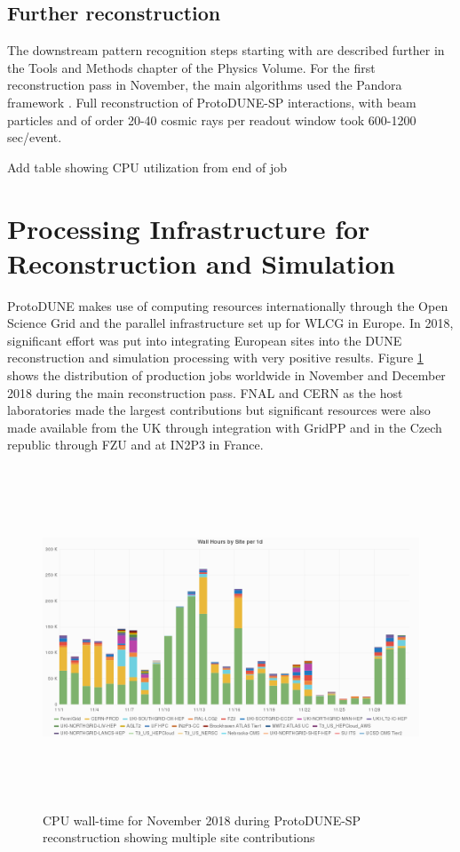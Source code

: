 \subsection{Further reconstruction}
The downstream pattern recognition steps starting with  are described further in the Tools and Methods chapter of the Physics Volume.  For the first reconstruction pass in November, the main algorithms used the Pandora framework \cite{Acciarri:2017hat}.
Full reconstruction of ProtoDUNE-SP interactions, with beam particles and of order 20-40 cosmic rays per readout window took 600-1200 sec/event.



 
  Add table showing CPU utilization from end of job



\section{Processing Infrastructure for Reconstruction and Simulation}
\label{ch-comp-processing}
ProtoDUNE makes use of computing resources internationally through the Open Science Grid and the parallel infrastructure set up for WLCG in Europe.  In 2018, significant effort was put into integrating European sites into the DUNE reconstruction and simulation processing with very positive results.  
Figure \ref{fig:ch-exec-comp-cpupie} shows the distribution of production jobs worldwide in November and December 2018 during the main reconstruction pass.  FNAL and CERN as the host laboratories made the largest contributions but significant resources were also made available from the UK through integration with GridPP and in the Czech republic through FZU and at IN2P3 in France. 

\begin{figure}[htp]
\centering
\includegraphics[height=4in]{graphics/comp-vo-summary.png}
\caption{CPU wall-time for November 2018 during ProtoDUNE-SP reconstruction showing multiple site contributions}
\label{fig:ch-exec-comp-cpupie}
\end{figure}

